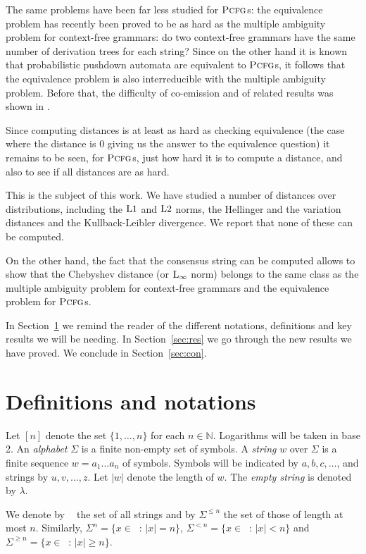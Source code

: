 \documentclass[submission]{eptcs} \usepackage{breakurl}             \usepackage[english]{babel}
\providecommand{\Nrat}{\ensuremath{{\mathds N}}}
\providecommand{\Lone}{\textup{L1}}
\providecommand{\Ltwo}{\textup{L2}}
\providecommand{\Linf}{\textup{L}\ensuremath{_{\infty}}}
\providecommand{\PCFG}{\ensuremath{\textsc{Pcfg}}}
\providecommand{\es}{\ensuremath{\lambda}}
\providecommand{\Sigmastar}{\ensuremath{\mathop{\Sigma^{\star}}}}
\begin{document}
The same problems have been far less studied for $\PCFG$s:  the equivalence problem has recently been proved \cite{fore14} to be as hard as the multiple ambiguity problem for context-free grammars: do two context-free grammars have the same number of derivation trees for each string?
Since on the other hand it is known \cite{abne99} that probabilistic pushdown automata are equivalent to  $\PCFG$s, it follows that the equivalence problem is also interreducible with the multiple ambiguity problem. Before that, the difficulty of co-emission and of related results was shown in \cite{jago01}.

Since computing distances is at least as hard as checking equivalence (the case where the distance is 0 giving us the answer to the equivalence question) it remains to be seen, for $\PCFG$s, just how hard it is to compute a distance, and also to see if all distances are as hard.

This is the subject of this work. We have studied a number of distances over distributions, including the $\Lone$ and $\Ltwo$ norms, the Hellinger and the variation distances and the Kullback-Leibler divergence. We report that none of these can be computed.

On the other hand, the fact that the consensus string can be computed allows to show that  the Chebyshev distance (or $\Linf$ norm) belongs to the same class as the multiple ambiguity problem for context-free grammars and the equivalence problem for $\PCFG$s.

In Section~\ref{sec:def} we remind the reader of the different notations, definitions and key results we will be needing. In Section~\ref{sec:res} we go through the new results we have proved. We conclude in Section~\ref{sec:con}.

\section{Definitions and notations}\label{sec:def}
Let $[n]$ denote the set $\{1,\ldots,n\}$ for each $n\in\Nrat$. Logarithms will be taken in base 2.
An \emph{alphabet} $\Sigma$ is a finite non-empty set of symbols.
A \textit{string} $w$ over $\Sigma$ is a finite sequence $w = a_1 \ldots a_n$
of symbols. Symbols  will be indicated by $a, b, c,\ldots$,
and  strings by $u, v,\ldots, z$.
Let $|w|$ denote the length of $w$.
The \emph{empty string} is denoted by $\es$.

We denote by $\Sigmastar$ the set of all strings and by $\Sigma^{\le n}$
the set of those of length at most $n$. Similarly, 
$\Sigma^{n}=\{x\in\Sigmastar:\,|x|=n\}$,
$\Sigma^{<n}=\{x\in\Sigmastar:\,|x|<n\}$ and 
$\Sigma^{\ge n}=\{x\in\Sigmastar:\,|x|\ge n\}$.
\end{document}
